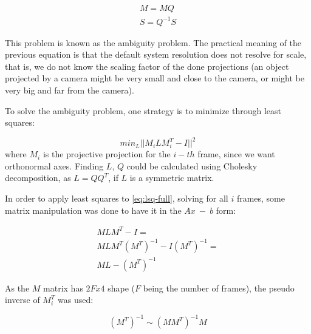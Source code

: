 \documentclass[]{IEEEtran}
\begin{document}
\begin{equation}
\begin{split}
    M = MQ \\
    S = Q^{-1}S
\end{split}
\label{eq:ambiguity-sol}
\end{equation}

This problem is known as the ambiguity problem. The practical meaning of the previous equation is that the default system resolution does not resolve for scale, that is, we do not know the scaling factor of the done projections (an object projected by a camera might be very small and close to the camera, or might be very big and far from the camera).
\par To solve the ambiguity problem, one strategy is to minimize through least squares:

\begin{equation}
        min_{L}||M_{i}LM_{i}^{T} - I||^{2}
        \label{eq:lsq-full}
\end{equation}
where $M_{i}$ is the projective projection for the $i-th$ frame, since we want orthonormal axes. Finding $L$, $Q$ could be calculated using Cholesky decomposition\cite{MCOOK}, as $L = QQ^{T}$, if $L$ is a symmetric matrix.
\par In order to apply least squares to \ref{eq:lsq-full}, solving for all $i$ frames, some matrix manipulation was done to have it in the $Ax\ -\ b$ form:

\begin{equation}
    \begin{split}
        MLM^{T} - I = \\
        MLM^{T}(M^{T})^{-1} - I(M^{T})^{-1} = \\
        ML - (M^{T})^{-1}
    \end{split}{}
\end{equation}{}

As the $M$ matrix has $2Fx4$ shape ($F$ being the number of frames), the pseudo inverse\cite{MCOOK} of $M_{i}^{T}$ was used:

\begin{equation}
    (M^{T})^{-1} \sim (MM^{T})^{-1}M
\end{equation}{}
\end{document}
